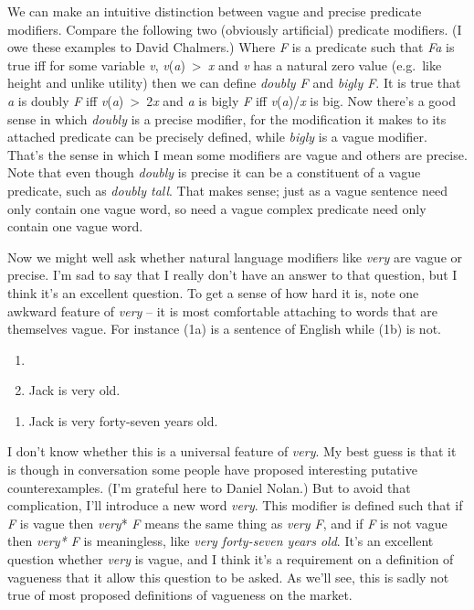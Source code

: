 \documentclass[
  10pt,
  letterpaper,
  DIV=11,
  numbers=noendperiod,
  twoside]{scrartcl}
\providecommand{\tightlist}{%
  \setlength{\itemsep}{0pt}\setlength{\parskip}{0pt}}\usepackage{longtable,booktabs,array}
\begin{document}
We can make an intuitive distinction between vague and precise predicate
modifiers. Compare the following two (obviously artificial) predicate
modifiers. (I owe these examples to David Chalmers.) Where \emph{F} is a
predicate such that \emph{Fa} is true iff for some variable \emph{v},
\emph{v}(\emph{a})~\textgreater~\emph{x} and \emph{v} has a natural zero
value (e.g.~like height and unlike utility) then we can define
\emph{doubly F} and \emph{bigly F}. It is true that \emph{a} is doubly
\emph{F} iff \emph{v}(\emph{a})~\textgreater~2\emph{x} and \emph{a} is
bigly \emph{F} iff \emph{v}(\emph{a})/\emph{x} is big. Now there's a
good sense in which \emph{doubly} is a precise modifier, for the
modification it makes to its attached predicate can be precisely
defined, while \emph{bigly} is a vague modifier. That's the sense in
which I mean some modifiers are vague and others are precise. Note that
even though \emph{doubly} is precise it can be a constituent of a vague
predicate, such as \emph{doubly tall}. That makes sense; just as a vague
sentence need only contain one vague word, so need a vague complex
predicate need only contain one vague word.

Now we might well ask whether natural language modifiers like
\emph{very} are vague or precise. I'm sad to say that I really don't
have an answer to that question, but I think it's an excellent question.
To get a sense of how hard it is, note one awkward feature of
\emph{very} -- it is most comfortable attaching to words that are
themselves vague. For instance (1a) is a sentence of English while (1b)
is not.

\begin{description}
\tightlist
\item[(1)]
\begin{enumerate}
\def\labelenumi{(\alph{enumi})}
\tightlist
\item[]
\item
  Jack is very old.
\end{enumerate}

\begin{enumerate}
\def\labelenumi{(\alph{enumi})}
\setcounter{enumi}{1}
\tightlist
\item
  Jack is very forty-seven years old.
\end{enumerate}
\end{description}

I don't know whether this is a universal feature of \emph{very}. My best
guess is that it is though in conversation some people have proposed
interesting putative counterexamples. (I'm grateful here to Daniel
Nolan.) But to avoid that complication, I'll introduce a new word
\emph{very}. This modifier is defined such that if \emph{F} is vague
then \emph{very}* \emph{F} means the same thing as \emph{very F}, and if
\emph{F} is not vague then \emph{very* F} is meaningless, like
\emph{very forty-seven years old}. It's an excellent question whether
\emph{very} is vague, and I think it's a requirement on a definition of
vagueness that it allow this question to be asked. As we'll see, this is
sadly not true of most proposed definitions of vagueness on the market.
\end{document}
